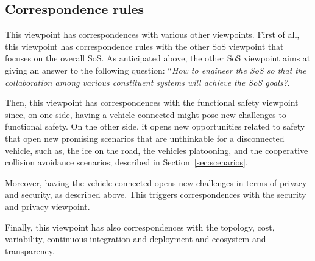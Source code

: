 
\subsection{Correspondence rules}

This viewpoint has correspondences with various other viewpoints. First of all, this viewpoint has correspondence rules with the other SoS viewpoint that focuses on the overall SoS. As anticipated above, the other SoS viewpoint aims at giving an answer to the following question: ``{\em How to engineer the SoS so that the collaboration among various constituent systems will achieve the SoS goals?}. 

Then, this viewpoint has correspondences with the functional safety viewpoint since, on one side, having a vehicle connected might pose new challenges to functional safety. On the other side, it opens new opportunities related to safety that open new promising scenarios that are unthinkable for a disconnected vehicle, such as, the ice on the road, the vehicles platooning, and the cooperative collision avoidance scenarios; described in Section~\ref{sec:scenarios}.

Moreover, having the vehicle connected opens new challenges in terms of privacy and security, as described above. This triggers correspondences with the security and privacy viewpoint.

Finally, this viewpoint has also correspondences with the topology, cost, variability, continuous integration and deployment and ecosystem and transparency.